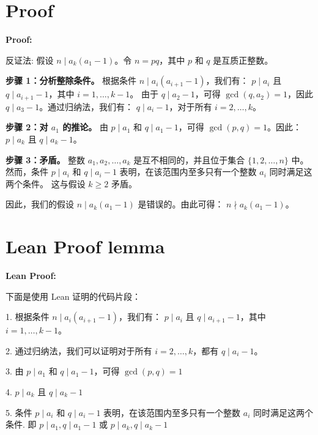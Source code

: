 \documentclass[a4paper]{article}
\begin{document}
\section*{Proof}
    \textbf{Proof:}

    反证法: 假设 $n \mid a_k(a_1-1)$。令 $n = pq$，其中 $p$ 和 $q$ 是互质正整数。

    \textbf{步骤 1：分析整除条件。}  
    根据条件 $n \mid a_i(a_{i+1}-1)$，我们有：
    $p \mid a_i$ 且 $q \mid a_{i+1}-1$，其中 $i = 1, \ldots, k-1$。
    由于 $q \mid a_2-1$，可得 $\gcd(q, a_2) = 1$，因此 $q \mid a_3-1$。通过归纳法，我们有：
    $q \mid a_i-1$，对于所有 $i = 2, \ldots, k$。

    \textbf{步骤 2：对 $a_1$ 的推论。}  
    由 $p \mid a_1$ 和 $q \mid a_1-1$，可得 $\gcd(p, q) = 1$。因此：
    $p \mid a_k$ 且 $q \mid a_k-1$。

    \textbf{步骤 3：矛盾。}  
    整数 $a_1, a_2, \ldots, a_k$ 是互不相同的，并且位于集合 $\{1, 2, \ldots, n\}$ 中。
    然而，条件 $p \mid a_i$ 和 $q \mid a_i-1$ 表明，在该范围内至多只有一个整数 $a_i$ 同时满足这两个条件。
    这与假设 $k \geq 2$ 矛盾。

    因此，我们的假设 $n \mid a_k(a_1-1)$ 是错误的。由此可得：
    $n \nmid a_k(a_1-1)$。

\section*{Lean Proof lemma}
    \textbf{Lean Proof:}

    下面是使用 Lean 证明的代码片段：

    1. 根据条件 $n \mid a_i(a_{i+1}-1)$，我们有：
    $p \mid a_i$ 且 $q \mid a_{i+1}-1$，其中 $i = 1, \ldots, k-1$。

    2. 通过归纳法，我们可以证明对于所有 $i = 2, \ldots, k$，都有 $q \mid a_i-1$。

    3. 由 $p \mid a_1$ 和 $q \mid a_1-1$，可得 $\gcd(p, q) = 1$

    4. $p \mid a_k$ 且 $q \mid a_k-1$

    5. 条件 $p \mid a_i$ 和 $q \mid a_i-1$ 表明，在该范围内至多只有一个整数 $a_i$ 同时满足这两个条件.
    即 $p \mid a_1, q \mid a_1-1$ 或 $p \mid a_k, q \mid a_k-1$



    
\end{document}
